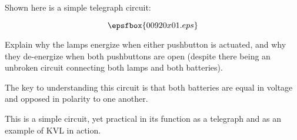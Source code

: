 

Shown here is a simple telegraph circuit:

$$\epsfbox{00920x01.eps}$$

Explain why the lamps energize when either pushbutton is actuated, and why they de-energize when both pushbuttons are open (despite there being an unbroken circuit connecting both lamps and both batteries).







The key to understanding this circuit is that both batteries are equal in voltage and opposed in polarity to one another.







This is a simple circuit, yet practical in its function as a telegraph and as an example of KVL in action.




